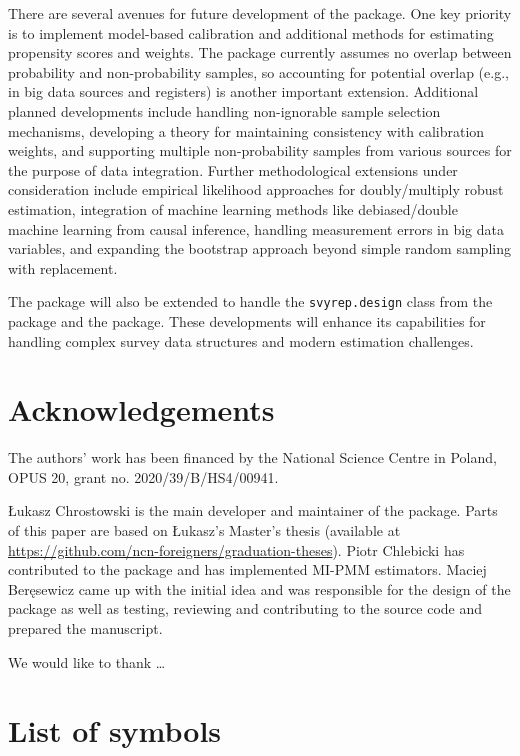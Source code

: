 \documentclass[
]{jss}
\begin{document}
There are several avenues for future development of the 
package. One key priority is to implement model-based calibration and
additional methods for estimating propensity scores and weights. The
package currently assumes no overlap between probability and
non-probability samples, so accounting for potential overlap (e.g., in
big data sources and registers) is another important extension.
Additional planned developments include handling non-ignorable sample
selection mechanisms, developing a theory for maintaining consistency
with calibration weights, and supporting multiple non-probability
samples from various sources for the purpose of data integration.
Further methodological extensions under consideration include empirical
likelihood approaches for doubly/multiply robust estimation, integration
of machine learning methods like debiased/double machine learning from
causal inference, handling measurement errors in big data variables, and
expanding the bootstrap approach beyond simple random sampling with
replacement.

The package will also be extended to handle the \texttt{svyrep.design}
class from the  package and the  package. These
developments will enhance its capabilities for handling complex survey
data structures and modern estimation challenges.

\section{Acknowledgements}\label{sec-acknowledgements}

The authors' work has been financed by the National Science Centre in
Poland, OPUS 20, grant no. 2020/39/B/HS4/00941.

Łukasz Chrostowski is the main developer and maintainer of the package.
Parts of this paper are based on Łukasz's Master's thesis (available at
\url{https://github.com/ncn-foreigners/graduation-theses}). Piotr
Chlebicki has contributed to the package and has implemented MI-PMM
estimators. Maciej Beręsewicz came up with the initial idea and was
responsible for the design of the package as well as testing, reviewing
and contributing to the source code and prepared the manuscript.

We would like to thank \ldots{}

\clearpage

\appendix

\section{List of symbols}\label{list-of-symbols}
\end{document}
